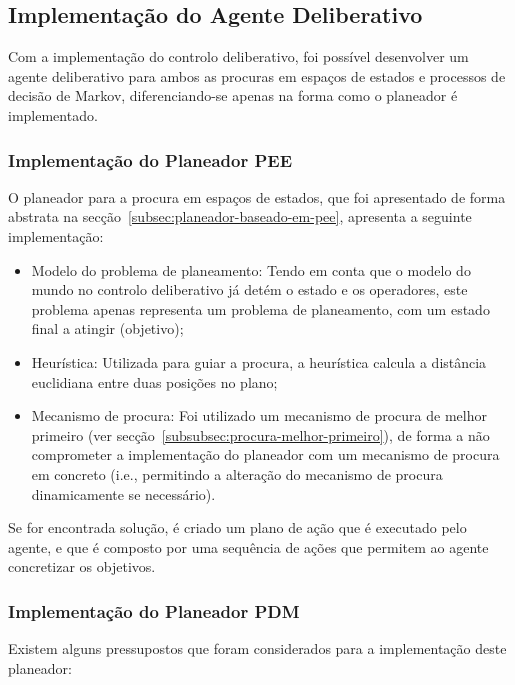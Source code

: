\subsection{Implementação do Agente Deliberativo}\label{subsec:implementacao-agente-deliberativo}

Com a implementação do controlo deliberativo, foi possível desenvolver um agente deliberativo para ambos as procuras em espaços de estados e processos de decisão de Markov, diferenciando-se apenas na forma como o planeador é implementado.

\subsubsection{Implementação do Planeador PEE}\label{subsubsec:implementacao-planeador-pee}

O planeador para a procura em espaços de estados, que foi apresentado de forma abstrata na secção~\ref{subsec:planeador-baseado-em-pee},
apresenta a seguinte implementação:

\begin{itemize}
    \item Modelo do problema de planeamento: Tendo em conta que o modelo do mundo no controlo deliberativo já detém o estado e os operadores, este problema apenas representa um problema de planeamento, com um estado final a atingir (objetivo);
    \item Heurística: Utilizada para guiar a procura, a heurística calcula a distância euclidiana entre duas posições no plano;
    \item Mecanismo de procura: Foi utilizado um mecanismo de procura de melhor primeiro (ver secção~\ref{subsubsec:procura-melhor-primeiro}), de forma a não comprometer a implementação do planeador com um mecanismo de procura em concreto (i.e., permitindo a alteração do mecanismo de procura dinamicamente se necessário).
\end{itemize}

Se for encontrada solução, é criado um plano de ação que é executado pelo agente, e que é composto por uma sequência de ações que permitem ao agente concretizar os objetivos.

\subsubsection{Implementação do Planeador PDM}\label{subsubsec:implementacao-planeador-pdm}

Existem alguns pressupostos que foram considerados para a implementação deste planeador:

